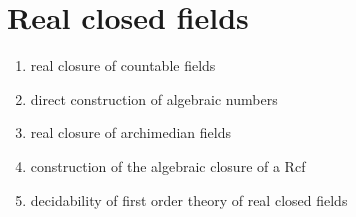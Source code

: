 \chapter{Real closed fields}

\begin{enumerate}
\item real closure of countable fields
\item direct construction of algebraic numbers
\item real closure of archimedian fields
\item construction of the algebraic closure of a Rcf
\item decidability of first order theory of real closed fields
\end{enumerate}


